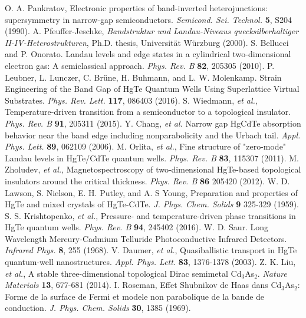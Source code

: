 \documentclass[titlepage,a4paper]{book}
\begin{document}
\begin{thebibliography}{199}
O. A. Pankratov, Electronic properties of band-inverted heterojunctions: supersymmetry in narrow-gap semiconductors. \textit{Semicond. Sci. Technol.} \textbf{5}, S204 (1990).
A. Pfeuffer-Jeschke, \textit{Bandstruktur und Landau-Niveaus quecksilberhaltiger II-IV-Heterostrukturen}, Ph.D. thesis, Universität Würzburg (2000).
S. Bellucci and P. Onorato. Landau levels and edge states in a cylindrical two-dimensional electron gas: A semiclassical approach. \textit{Phys. Rev. B} \textbf{82}, 205305 (2010).
P. Leubner, L. Lunczer, C. Brüne, H. Buhmann, and L. W. Molenkamp. Strain Engineering of the Band Gap of HgTe Quantum Wells Using Superlattice Virtual Substrates. \textit{Phys. Rev. Lett.} \textbf{117}, 086403 (2016).
S. Wiedmann, \textit{et al.}, Temperature-driven transition from a semiconductor to a topological insulator. \textit{Phys. Rev. B} \textbf{91}, 205311 (2015).
Y. Chang, \textit{et al.} Narrow gap HgCdTe absorption behavior near the band edge including nonparabolicity and the Urbach tail. \textit{Appl. Phys. Lett.} \textbf{89}, 062109 (2006).
M. Orlita, \textit{et al.}, Fine structure of "zero-mode" Landau levels in HgTe/CdTe quantum wells. \textit{Phys. Rev. B} \textbf{83}, 115307 (2011).
M. Zholudev, \textit{et al.}, Magnetospectroscopy of two-dimensional HgTe-based topological insulators around the critical thickness. \textit{Phys. Rev. B} \textbf{86} 205420 (2012).
W. D. Lawson, S. Nielson, E. H. Putley, and A. S Young, Preparation and properties of HgTe and mixed crystals of HgTe-CdTe. \textit{J. Phys. Chem. Solids} \textbf{9} 325-329 (1959).
S. S. Krishtopenko, \textit{et al.}, Pressure- and temperature-driven phase transitions in HgTe quantum wells. \textit{Phys. Rev. B} \textbf{94}, 245402 (2016).
W. D. Saur. Long Wavelength Mercury-Cadmium Telluride Photoconductive Infrared Detectors. \textit{Infrared Phys.} \textbf{8}, 255 (1968).
V. Daumer, \textit{et al.}, Quasiballistic transport in HgTe quantum-well nanostructures. \textit{Appl. Phys. Lett.} \textbf{83}, 1376-1378 (2003).
Z. K. Liu, \textit{et al.}, A stable three-dimensional topological Dirac semimetal Cd$_3$As$_2$. \textit{Nature Materials} \textbf{13}, 677-681 (2014).  
I. Roseman, Effet Shubnikov de Haas dans Cd$_3$As$_2$: Forme de la surface de Fermi et modele non parabolique de la bande de conduction. \textit{J. Phys. Chem. Solids} \textbf{30}, 1385 (1969).

\end{thebibliography}
\end{document}
